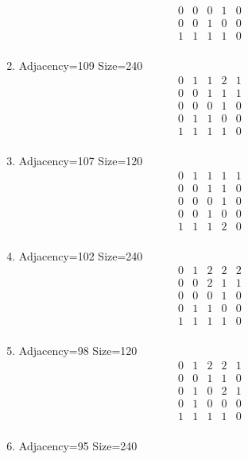 \documentclass[12pt]{article}
\begin{document}
\begin{multicols}{3}
\begin{enumerate}
\begin{equation*}
\begin{array}{ccccc}
0&0&0&1&0\\
0&0&1&0&0\\
1&1&1&1&0\\
\end{array}
\end{equation*}
\item Adjacency=109 Size=240
\begin{equation*}
\begin{array}{ccccc}
0&1&1&2&1\\
0&0&1&1&1\\
0&0&0&1&0\\
0&1&1&0&0\\
1&1&1&1&0\\
\end{array}
\end{equation*}
\item Adjacency=107 Size=120
\begin{equation*}
\begin{array}{ccccc}
0&1&1&1&1\\
0&0&1&1&0\\
0&0&0&1&0\\
0&0&1&0&0\\
1&1&1&2&0\\
\end{array}
\end{equation*}
\item Adjacency=102 Size=240
\begin{equation*}
\begin{array}{ccccc}
0&1&2&2&2\\
0&0&2&1&1\\
0&0&0&1&0\\
0&1&1&0&0\\
1&1&1&1&0\\
\end{array}
\end{equation*}
\item Adjacency=98 Size=120
\begin{equation*}
\begin{array}{ccccc}
0&1&2&2&1\\
0&0&1&1&0\\
0&1&0&2&1\\
0&1&0&0&0\\
1&1&1&1&0\\
\end{array}
\end{equation*}
\item Adjacency=95 Size=240
\begin{equation*}

\end{equation*}
\end{enumerate}
\end{multicols}
\end{document}
